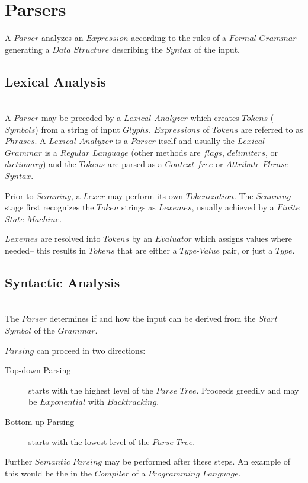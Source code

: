 \documentclass{article}
\begin{document}
\section{Parsers}

A $Parser$ analyzes an $Expression$ according to the rules of a
$Formal$ $Grammar$ generating a $Data$ $Structure$ describing the
$Syntax$ of the input.

\subsection{Lexical Analysis} \hfill \\
A $Parser$ may be preceded by a $Lexical$ $Analyzer$ which creates
$Tokens$ ($Symbols$) from a string of input $Glyphs$. $Expressions$ of
$Tokens$ are referred to as $Phrases$. A $Lexical$ $Analyzer$ is a
$Parser$ itself and usually the $Lexical$ $Grammar$ is a $Regular$
$Language$ (other methods are $flags$, $delimiters$, or $dictionary$)
and the $Tokens$ are parsed as a $Context$-$free$ or $Attribute$
$Phrase$ $Syntax$.

Prior to $Scanning$, a $Lexer$ may perform its own $Tokenization$.
The $Scanning$ stage first recognizes the $Token$ strings as
$Lexemes$, usually achieved by a $Finite$ $State$ $Machine$.

$Lexemes$ are resolved into $Tokens$ by an $Evaluator$ which assigns
values where needed-- this results in $Tokens$ that are either a
$Type$-$Value$ pair, or just a $Type$.

\subsection{Syntactic Analysis} \hfill \\
The $Parser$ determines if and how the input can be derived from the
$Start$ $Symbol$ of the $Grammar$.

$Parsing$ can proceed in two directions:

\begin{description}
    \item[Top-down Parsing]
    starts with the highest level of the $Parse$ $Tree$. Proceeds greedily
    and may be $Exponential$ with $Backtracking$.
    \item[Bottom-up Parsing]
    starts with the lowest level of the $Parse$ $Tree$.
\end{description}

Further $Semantic$ $Parsing$ may be performed after these steps. An
example of this would be the in the $Compiler$ of a $Programming$
$Language$.
\end{document}
